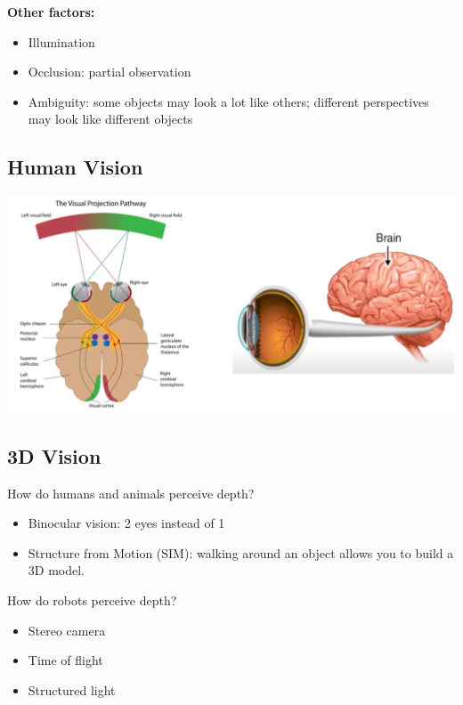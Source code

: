 \documentclass[10pt]{article}
\begin{document}
\pagebreak
\textbf{Other factors:}
\begin{itemize}
	\item Illumination
	\item Occlusion: partial observation
	\item Ambiguity: some objects may look a lot like others; different perspectives may look like different objects
\end{itemize}

\subsection*{Human Vision}
\begin{center} 
	\includegraphics*[width=\textwidth]{L1_27.png} 
\end{center}

\subsection*{3D Vision}
How do humans and animals perceive depth?
\begin{itemize}
	\item Binocular vision: 2 eyes instead of 1
	\item Structure from Motion (SIM): walking around an object allows you to build a 3D model.
\end{itemize}
How do robots perceive depth?
\begin{itemize}
	\item Stereo camera
	\item Time of flight
	\item Structured light
\end{itemize}
\end{document}
